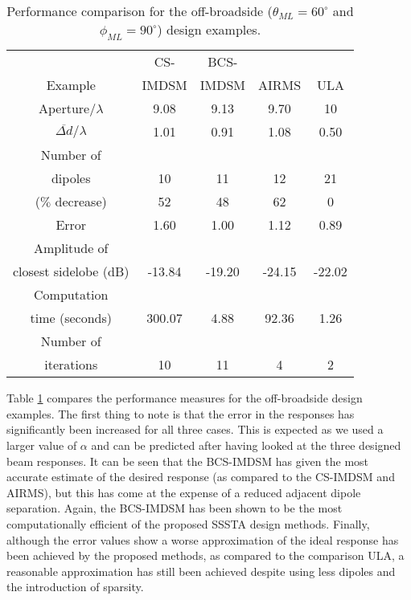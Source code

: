 \documentclass[10pt,final]{IEEEtran}
\begin{document}
\begin{table}
\caption{\rm Performance comparison for the off-broadside ($\theta_{ML}=60^{\circ}$ and $\phi_{ML}=90^{\circ}$) design examples.} \centering
\begin{tabular}{|c|c|c|c|c|}
  \hline
   & CS- & BCS- &  &\\
  Example & IMDSM & IMDSM & AIRMS &ULA\\
  \hline
  Aperture/$\lambda$ & 9.08 & 9.13 & 9.70 &10\\
  $\overline{\Delta{d}}/\lambda$ & 1.01 & 0.91 & 1.08 &0.50\\
  \hline
  Number of &  &  &  &\\
  dipoles & 10 & 11 & 12 &21\\
  ($\%$ decrease) & 52 & 48 & 62& 0\\
  \hline
  Error & 1.60 & 1.00 & 1.12 &0.89\\
  \hline
  Amplitude of &  &  &  &\\
  closest sidelobe (dB)& -13.84 & -19.20 & -24.15 &-22.02\\
  \hline
  Computation &  &  & & \\
  time (seconds) & 300.07 & 4.88 & 92.36 &1.26\\
  \hline
  Number of &  &  & & \\
  iterations & 10 & 11 & 4 &2\\
  \hline
\end{tabular}
\label{tb:linearoffbroadcompare}
\end{table}


Table \ref {tb:linearoffbroadcompare} compares the performance measures for the off-broadside design examples.  The first thing to note is that the error in the responses has significantly been increased for all three cases.  This is expected as we used a larger value of $\alpha$ and can be predicted after having looked at the three designed beam responses.  It can be seen that the BCS-IMDSM has given the most accurate estimate of the desired response (as compared to the CS-IMDSM and AIRMS), but this has come at the expense of a reduced adjacent dipole separation.  Again, the BCS-IMDSM has been shown to be the most computationally efficient of the proposed SSSTA design methods.  Finally, although the error values show a worse approximation of the ideal response has been achieved by the proposed methods, as compared to the comparison ULA, a reasonable approximation has still been achieved despite using less dipoles and the introduction of sparsity.
\end{document}
